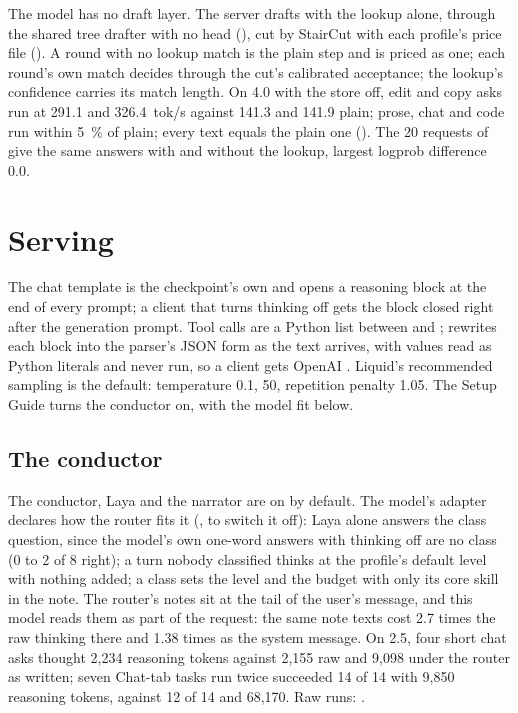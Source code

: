 The model has no draft layer. The server drafts with the lookup alone, through the shared tree drafter with no head (), cut by StairCut with each profile's price file (). A round with no lookup match is the plain step and is priced as one; each round's own match decides through the cut's calibrated acceptance; the lookup's confidence carries its match length. On 4.0 with the store off, edit and copy asks run at 291.1 and 326.4~tok/s against 141.3 and 141.9 plain; prose, chat and code run within 5~\% of plain; every text equals the plain one (\measured). The 20 requests of  give the same answers with and without the lookup, largest logprob difference 0.0.


\section{Serving}

The chat template is the checkpoint's own and opens a reasoning block at the end of every prompt; a client that turns thinking off gets the block closed right after the generation prompt. Tool calls are a Python list between  and ;  rewrites each block into the parser's JSON form as the text arrives, with values read as Python literals and never run, so a client gets OpenAI . Liquid's recommended sampling is the default: temperature 0.1,  50, repetition penalty 1.05. The Setup Guide turns the conductor on, with the model fit below.

\subsection{The conductor}\label{sec:lfm25-conductor}
The conductor, Laya and the narrator are on by default. The model's adapter declares how the router fits it (,  to switch it off): Laya alone answers the class question, since the model's own one-word answers with thinking off are no class (0 to 2 of 8 right); a turn nobody classified thinks at the profile's default level with nothing added; a class sets the level and the budget with only its core skill in the note. The router's notes sit at the tail of the user's message, and this model reads them as part of the request: the same note texts cost 2.7 times the raw thinking there and 1.38 times as the system message. On 2.5, four short chat asks thought 2,234 reasoning tokens against 2,155 raw and 9,098 under the router as written; seven Chat-tab tasks run twice succeeded 14 of 14 with 9,850 reasoning tokens, against 12 of 14 and 68,170. Raw runs: .

